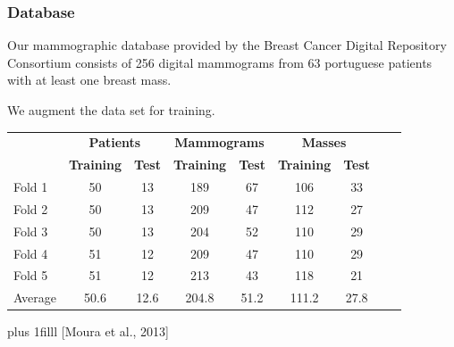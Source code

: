 \documentclass{beamer}
\newcommand{\source}[1]{\vskip0pt plus 1filll \scriptsize #1}
\begin{document}
    \begin{frame}
        \frametitle{Database}
        Our mammographic database provided by the Breast Cancer Digital Repository Consortium consists of 256 digital mammograms from 63 portuguese patients with at least one breast mass. %
        
        We augment the data set for training.
        \small
        \begin{table}[h]
	        \centering
	        \begin{tabular}{lcccccccc}
		        \hline
		        & \multicolumn{2}{c}{\textbf{Patients}} & \multicolumn{2}{c}{\textbf{Mammograms}} &\multicolumn{2}{c}{\textbf{Masses}}\\
		        & \textbf{Training} & \textbf{Test} & \textbf{Training} & \textbf{Test} & \textbf{Training} & \textbf{Test} \\
		        \hline 
		        Fold 1	&50	&13	&189	&67	&106	&33\\
		        Fold 2	&50	&13	&209	&47	&112	&27\\
		        Fold 3	&50	&13	&204	&52	&110	&29\\
		        Fold 4	&51	&12	&209	&47	&110	&29\\
		        Fold 5	&51	&12 &213	&43	&118	&21\\
		        Average &50.6 &12.6 &204.8 &51.2 &111.2 &27.8\\
		        \hline
	        \end{tabular}
        \end{table}
        \source[Moura et al., 2013]
    \end{frame}
    
\end{document}

